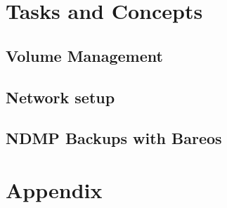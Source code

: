 \documentclass[10pt,a4paper]{book}
\begin{document}
    
    
    
    
    
    
    


\part{Tasks and Concepts}





\chapter{Volume Management}
  
  













%    







\chapter{Network setup}
    
    
    




\chapter{NDMP Backups with Bareos}






\appendix
\part{Appendix}
\end{document}
